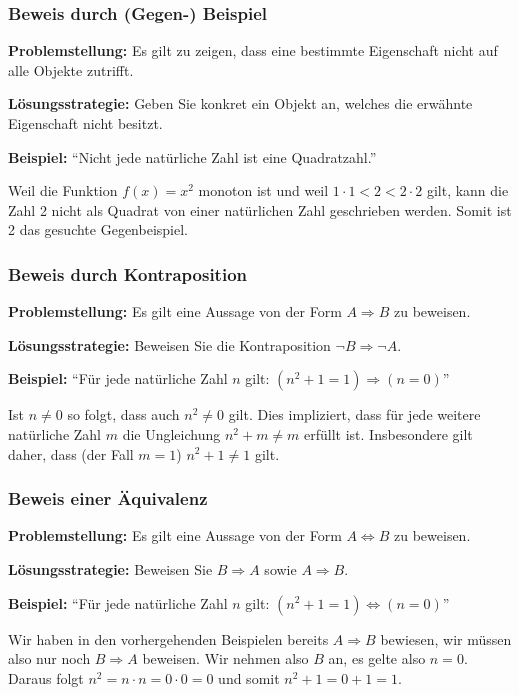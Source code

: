 \subsubsection{Beweis durch (Gegen-) Beispiel}

\textbf{Problemstellung:} Es gilt zu zeigen, dass eine bestimmte Eigenschaft nicht auf alle Objekte zutrifft.

\textbf{Lösungsstrategie:} Geben Sie konkret ein Objekt an, welches die erwähnte Eigenschaft nicht besitzt.

\textbf{Beispiel:} ``Nicht jede natürliche Zahl ist eine Quadratzahl.''

Weil die Funktion $f(x) = x^2$ monoton ist und weil $1 \cdot 1 < 2 < 2 \cdot 2$ gilt, kann die Zahl 2 nicht als Quadrat von einer natürlichen Zahl geschrieben werden.
Somit ist 2 das gesuchte Gegenbeispiel.

\subsubsection{Beweis durch Kontraposition}

\textbf{Problemstellung:} Es gilt eine Aussage von der Form $A \Rightarrow B$ zu beweisen.

\textbf{Lösungsstrategie:} Beweisen Sie die Kontraposition $\neg B \Rightarrow \neg A$.

\textbf{Beispiel:} ``Für jede natürliche Zahl $n$ gilt: $(n^2 + 1 = 1) \Rightarrow (n = 0)$''

Ist $n \neq 0$ so folgt, dass auch $n^2 \neq 0$ gilt.
Dies impliziert, dass für jede weitere natürliche Zahl $m$ die Ungleichung $n^2 + m \neq m$ erfüllt ist.
Insbesondere gilt daher, dass (der Fall $m=1$) $n^2 + 1 \neq 1$ gilt.

\subsubsection{Beweis einer Äquivalenz}

\textbf{Problemstellung:}  Es gilt eine Aussage von der Form $A \Leftrightarrow B$ zu beweisen.

\textbf{Lösungsstrategie:} Beweisen Sie $B \Rightarrow A$ sowie $A \Rightarrow B$.

\textbf{Beispiel:} ``Für jede natürliche Zahl $n$ gilt: $(n^2 + 1 = 1) \Leftrightarrow (n = 0)$''

Wir haben in den vorhergehenden Beispielen bereits $A \Rightarrow B$ bewiesen, wir müssen also nur noch $B \Rightarrow A$ beweisen.
Wir nehmen also $B$ an, es gelte also $n = 0$.
Daraus folgt $n^2 = n \cdot n = 0 \cdot 0 = 0$ und somit $n^2 + 1 = 0 + 1 = 1$.

